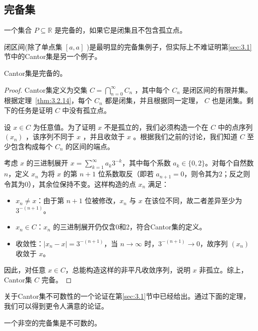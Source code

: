 \subsection{完备集}
\begin{Def}
  一个集合 \(P \subseteq  \mathbb{R}\) 是完备的，如果它是闭集且不包含孤立点。
\end{Def}
 
闭区间(除了单点集 \(\left\lbrack  {a,a}\right\rbrack\) )是最明显的完备集例子，但实际上不难证明第\ref{sec:3.1}节中的Cantor集是另一个例子。

\begin{Thm}
  \label{thm:3.4.2}
  Cantor集是完备的。
\end{Thm}

\begin{proof}
Cantor集定义为交集 \(C = \mathop{\bigcap }\limits_{{n = 0}}^{\infty }{C}_{n}\) ，其中每个 \({C}_{n}\) 是闭区间的有限并集。根据定理~\ref{thm:3.2.14}，每个 \({C}_{n}\) 都是闭集，并且根据同一定理， \(C\) 也是闭集。剩下的任务是证明 \(C\) 中没有孤立点。

设 \(x \in  C\) 为任意值。为了证明 \(x\) 不是孤立的，我们必须构造一个在 \(C\) 中的点序列 \(\left( {x}_{n}\right)\) ，该序列不同于 \(x\) ，并且收敛于 \(x\) 。根据我们之前的讨论，我们知道 \(C\) 至少包含构成每个 \({C}_{n}\) 的区间的端点。

考虑 \(x\) 的三进制展开 \(x = \sum_{k=1}^{\infty} a_k 3^{-k}\)，其中每个系数 \(a_k \in \{0, 2\}\)。对每个自然数 \(n\)，定义 \(x_n\) 为将 \(x\) 的第 \(n+1\) 位系数取反（即若 \(a_{n+1}=0\)，则令其为$2$；反之则令其为$0$），其余位保持不变。这样构造的点 \(x_n\) 满足：

\begin{itemize}
\item  \(x_n \neq x\)：由于第 \(n+1\) 位被修改，\(x_n\) 与 \(x\) 在该位不同，故二者差异至少为 \(3^{-(n+1)}\)。
\item \(x_n \in C\)：\(x_n\) 的三进制展开仍仅含0和2，符合Cantor集的定义。
\item 收敛性：\(|x_n - x| = 3^{-(n+1)}\)，当 \(n \to \infty\) 时，\(3^{-(n+1)} \to 0\)，故序列 \((x_n)\) 收敛于 \(x\)。
\end{itemize}
因此，对任意 \(x \in C\)，总能构造这样的非平凡收敛序列，说明 \(x\) 非孤立。综上，Cantor集 \(C\) 完备。
\end{proof}


关于Cantor集不可数性的一个论证在第\ref{sec:3.1}节中已经给出。通过下面的定理，我们可以得到更令人满意的论证。

\begin{Thm}
  \label{thm:3.4.3}
  一个非空的完备集是不可数的。
\end{Thm}

